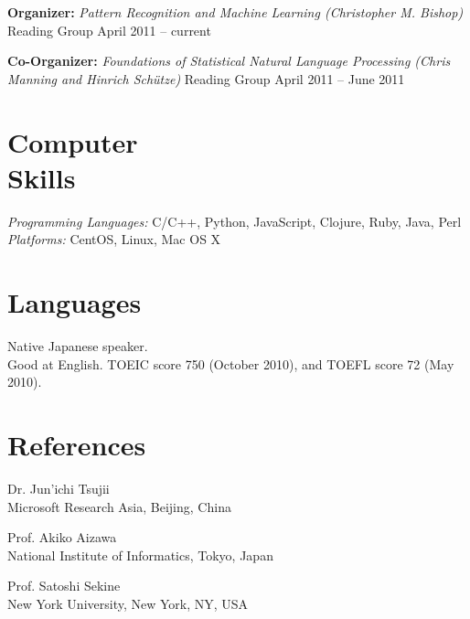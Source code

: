 \documentclass[margin]{res}
\begin{document}
\begin{resume}
\textbf{Organizer:} {\sl Pattern Recognition and Machine Learning (Christopher M. Bishop)} Reading Group \hfill April 2011 -- current

\textbf{Co-Organizer:} {\sl Foundations of Statistical Natural Language Processing (Chris Manning and Hinrich Schütze)} Reading Group \hfill April 2011 -- June 2011\\


\section{Computer \\ Skills}
\textit{Programming Languages:} C/C++, Python, JavaScript, Clojure, Ruby, Java, Perl \\
\textit{Platforms:} CentOS, Linux, Mac OS X\\

\section{Languages}
Native Japanese speaker.\\
Good at English. TOEIC score 750 (October 2010), and TOEFL score 72 (May 2010). \\

\section{References} 
Dr. Jun'ichi Tsujii \\
Microsoft Research Asia, Beijing, China

Prof. Akiko Aizawa \\
National Institute of Informatics, Tokyo, Japan

Prof. Satoshi Sekine \\
New York University, New York, NY, USA
\end{resume}
\end{document}
